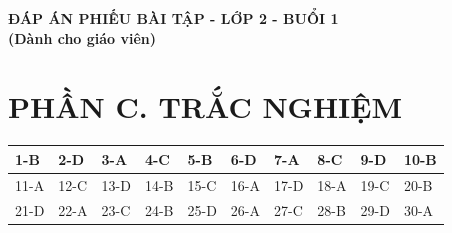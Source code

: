 \documentclass[11pt,a4paper]{article}
\begin{document}
\begin{center}
{\Large\textbf{ĐÁP ÁN PHIẾU BÀI TẬP - LỚP 2 - BUỔI 1}}\\[0.5mm]
{\normalsize\textbf{(Dành cho giáo viên)}}
\end{center}
\section*{PHẦN C. TRẮC NGHIỆM}
\begin{tabularx}{\linewidth}{|*{10}{X|}}\hline
1-B & 2-D & 3-A & 4-C & 5-B & 6-D & 7-A & 8-C & 9-D & 10-B\\\hline
11-A & 12-C & 13-D & 14-B & 15-C & 16-A & 17-D & 18-A & 19-C & 20-B\\\hline
21-D & 22-A & 23-C & 24-B & 25-D & 26-A & 27-C & 28-B & 29-D & 30-A\\\hline
\end{tabularx}
\end{document}
